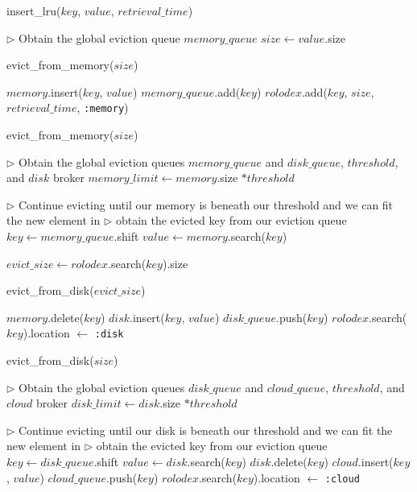 \begin{algorithm}[htp]
\small
\caption{\label{alg:insert_lru}insert\_lru($key$, $value$, $retrieval\_time$)}
\begin{algorithmic}[1]
\STATE $\triangleright$ Obtain the global eviction queue $memory\_queue$
\STATE $size \leftarrow value$.size

  \STATE evict\_from\_memory($size$)
\ENDIF

\STATE $memory$.insert($key$, $value$)
\STATE $memory\_queue$.add($key$)
\STATE $rolodex$.add($key$, $size$, $retrieval\_time$, {\tt :memory})
\end{algorithmic}
\end{algorithm}

\begin{algorithm}[htp]
\small
\caption{\label{alg:evict_mem_lru}evict\_from\_memory($size$)}
\begin{algorithmic}[1]
\STATE $\triangleright$ Obtain the global eviction queues $memory\_queue$ and
$disk\_queue$, $threshold$, and $disk$ broker
\STATE $memory\_limit \leftarrow memory$.size $* threshold$

\STATE $\triangleright$ Continue evicting until our memory is beneath our
threshold and we can fit the new element in
  \STATE $\triangleright$ obtain the evicted key from our eviction queue
  \STATE $key \leftarrow memory\_queue$.shift
  \STATE $value \leftarrow memory$.search($key$)

	\STATE $evict\_size \leftarrow rolodex$.search($key$).size

		\STATE evict\_from\_disk($evict\_size$)
	\ENDIF

  \STATE $memory$.delete($key$)
  \STATE $disk$.insert($key$, $value$)
	\STATE $disk\_queue$.push($key$)
	\STATE $rolodex$.search($key$).location $\leftarrow$ {\tt :disk}
\ENDWHILE
\end{algorithmic}
\end{algorithm}

\begin{algorithm}[htp]
\small
\caption{\label{alg:evict_disk_lru}evict\_from\_disk($size$)}
\begin{algorithmic}[1]
\STATE $\triangleright$ Obtain the global eviction queues $disk\_queue$ and
$cloud\_queue$, $threshold$, and $cloud$ broker
\STATE $disk\_limit \leftarrow disk$.size $* threshold$

\STATE $\triangleright$ Continue evicting until our disk is beneath our
threshold and we can fit the new element in
  \STATE $\triangleright$ obtain the evicted key from our eviction queue
  \STATE $key \leftarrow disk\_queue$.shift
  \STATE $value \leftarrow disk$.search($key$)
  \STATE $disk$.delete($key$)
  \STATE $cloud$.insert($key$, $value$)
	\STATE $cloud\_queue$.push($key$)
	\STATE $rolodex$.search($key$).location $\leftarrow$ {\tt :cloud}
\ENDWHILE
\end{algorithmic}
\end{algorithm}

